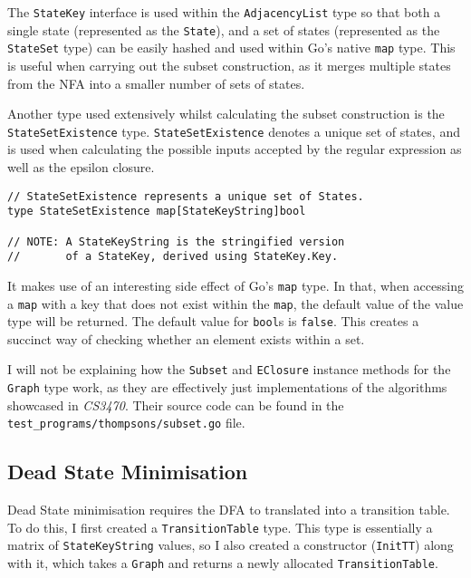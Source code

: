 The \verb|StateKey| interface is used within the \verb|AdjacencyList| type so that both a single state (represented as the \verb|State|), and a set of states (represented as the \verb|StateSet| type) can be easily hashed and used within Go's native \verb|map| type. This is useful when carrying out the subset construction, as it merges multiple states from the NFA into a smaller number of sets of states.

Another type used extensively whilst calculating the subset construction is the \verb|StateSetExistence| type. \verb|StateSetExistence| denotes a unique set of states, and is used when calculating the possible inputs accepted by the regular expression as well as the epsilon closure.

\begin{verbatim}
// StateSetExistence represents a unique set of States.
type StateSetExistence map[StateKeyString]bool

// NOTE: A StateKeyString is the stringified version 
//       of a StateKey, derived using StateKey.Key.
\end{verbatim}

It makes use of an interesting side effect of Go's \verb|map| type. In that, when accessing a \verb|map| with a key that does not exist within the \verb|map|, the default value of the value type will be returned. The default value for \verb|bool|s is \verb|false|. This creates a succinct way of checking whether an element exists within a set.

I will not be explaining how the \verb|Subset| and \verb|EClosure| instance methods for the \verb|Graph| type work, as they are effectively just implementations of the algorithms showcased in \textit{CS3470}. Their source code can be found in the \verb|test_programs/thompsons/subset.go| file.

\subsection{Dead State Minimisation}

Dead State minimisation requires the DFA to translated into a transition table. To do this, I first created a \verb|TransitionTable| type. This type is essentially a matrix of \verb|StateKeyString| values, so I also created a constructor (\verb|InitTT|) along with it, which takes a \verb|Graph| and returns a newly allocated \verb|TransitionTable|.

